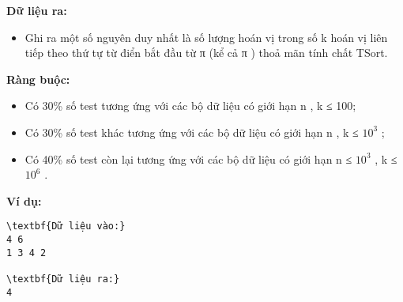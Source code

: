 \textbf{Dữ liệu ra: }
\begin{itemize}
	\item Ghi ra một số nguyên duy nhất là số lượng hoán vị trong số k hoán vị liên tiếp theo thứ tự từ điển bắt đầu từ π  (kể cả π ) thoả mãn tính chất TSort.
\end{itemize}

\textbf{Ràng buộc: }
\begin{itemize}
	\item Có 30\% số test tương ứng với các bộ dữ liệu có giới hạn n , k ≤ 100;
	\item Có 30\% số test khác tương ứng với các bộ dữ liệu có giới hạn n , k ≤ $10^{3}$ ;
	\item Có 40\% số test còn lại tương ứng với các bộ dữ liệu có giới hạn n ≤ $10^{3}$ , k ≤ $10^{6}$ .
\end{itemize}

\textbf{Ví dụ: }
\begin{verbatim}
\textbf{Dữ liệu vào:}
4 6
1 3 4 2

\textbf{Dữ liệu ra:}
4\end{verbatim}
